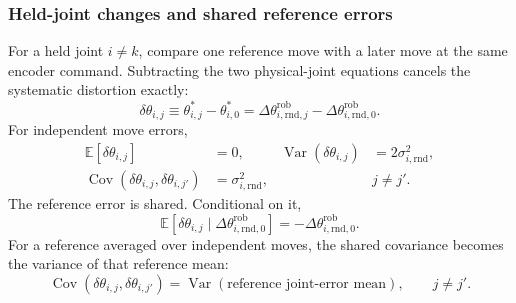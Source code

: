 \documentclass[../main.tex]{subfiles}
\begin{document}
\subsubsection{Held-joint changes and shared reference errors}
For a held joint $i\ne k$, compare one reference move with a later move at the same encoder command. Subtracting the two physical-joint equations cancels the systematic distortion exactly:
\begin{equation}\label{eq:held-joint-error}
\delta\theta_{i,j}\equiv\theta^*_{i,j}-\theta^*_{i,0}
=\Delta\theta^{\mathrm{rob}}_{i,\mathrm{rnd},j}-\Delta\theta^{\mathrm{rob}}_{i,\mathrm{rnd},0}.
\end{equation}
For independent move errors,
\begin{equation}\label{eq:held-joint-statistics}
\begin{aligned}
\mathbb E[\delta\theta_{i,j}]&=0,&
\operatorname{Var}(\delta\theta_{i,j})&=2\sigma_{i,\mathrm{rnd}}^2,\\
\operatorname{Cov}(\delta\theta_{i,j},\delta\theta_{i,j'})&=\sigma_{i,\mathrm{rnd}}^2,&&j\ne j'.
\end{aligned}
\end{equation}
The reference error is shared. Conditional on it,
\begin{equation*}
\mathbb E[\delta\theta_{i,j}\mid\Delta\theta^{\mathrm{rob}}_{i,\mathrm{rnd},0}]
=-\Delta\theta^{\mathrm{rob}}_{i,\mathrm{rnd},0}.
\end{equation*}
For a reference averaged over independent moves, the shared covariance becomes the variance of that reference mean:
\begin{equation*}
\operatorname{Cov}(\delta\theta_{i,j},\delta\theta_{i,j'})=
\operatorname{Var}(\text{reference joint-error mean}),\qquad j\ne j'.
\end{equation*}
\end{document}
